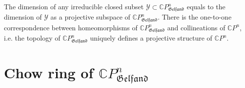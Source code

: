 \documentclass{beamer}
\theoremstyle{plain}
\newcommand{\C}{\mathbb{C}}
\newcommand{\sY}{\mathcal{Y}}       %
\begin{document}
  \begin{frame}
  	
  	
  	The dimension of any irreducible  closed subset $\sY\subset  \C P^n_{\mathfrak{Gelfand}}$ equals to the dimension of $\sY$ as a projective subspace of $\C P^n_{\mathfrak{Gelfand}}$. There is the one-to-one correspondence between homeomorphisms of $\C P^n_{\mathfrak{Gelfand}}$ and collineations of $\C P^n$, i.e. the topology of $\C P^n_{\mathfrak{Gelfand}}$ uniquely defines a projective structure of $\C P^n$.
  	
  \end{frame}
   \section{Chow ring  of $\C P^n_{\mathfrak{Gelfand}}$}
   
\end{document}
